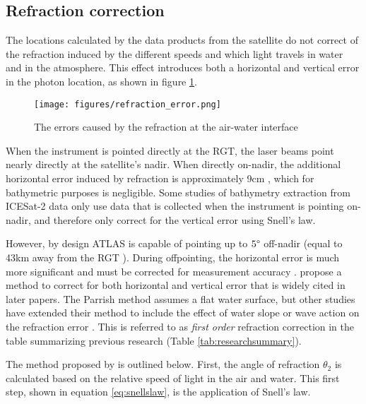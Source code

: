 \subsection{Refraction correction}
The locations calculated by the data products from the satellite do not correct of the refraction induced by the different speeds and which light travels in water and in the atmosphere. This effect introduces both a horizontal and vertical error in the photon location, as shown in figure \ref{refract-image}.

\begin{figure}[ht]
      \centering
      \texttt{[image: figures/refraction\_error.png]}
      \caption{The errors caused by the refraction at the air-water interface}
      \label{refract-image}
\end{figure}

When the instrument is pointed directly at the RGT, the laser beams point nearly directly at the satellite's nadir. When directly on-nadir, the additional horizontal error induced by refraction is approximately 9cm \parencite{Parrish2019}, which for bathymetric purposes is negligible. Some studies of bathymetry extraction from ICESat-2 data only use data that is collected when the instrument is pointing on-nadir, and therefore only correct for the vertical error using Snell's law.

However, by design ATLAS is capable of pointing up to $5 \degree$ off-nadir (equal to 43km away from the RGT \parencite{Magruder2021}). During offpointing, the horizontal error is much more significant and must be corrected for measurement accuracy \parencite{Parrish2019}. \citeauthor{Parrish2019} propose a method to correct for both horizontal and vertical error that is widely cited in later papers. The Parrish method assumes a flat water surface, but other studies have extended their method to include the effect of water slope or wave action on the refraction error \parencite{Ma2020,Zhang2022}.  This is referred to as \emph{first order} refraction correction in the table summarizing previous research (Table \ref{tab:researchsummary}).

The method proposed by \citeauthor{Parrish2019} is outlined below. First, the angle of refraction $\theta_2$ is calculated based on the relative speed of light in the air and water. This first step, shown in equation \ref{eq:snellslaw}, is the application of Snell's law.

